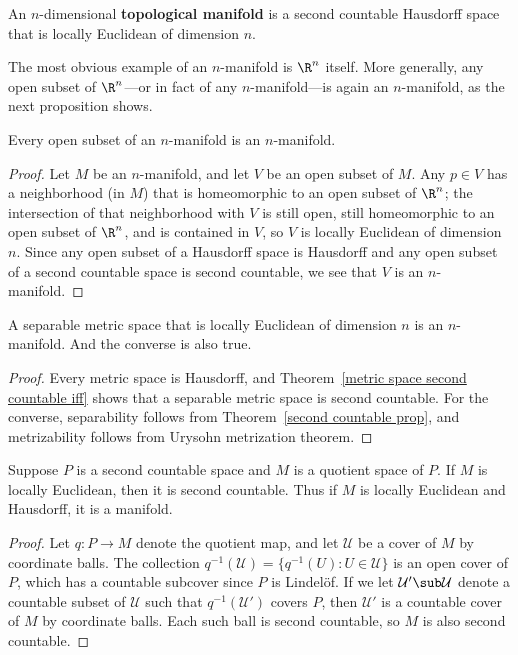 \begin{definition}
An $n$-dimensional \textbf{topological manifold} is a second countable Hausdorff space that is locally Euclidean of dimension $n$.
\end{definition}
The most obvious example of an $n$-manifold is $\R^n$ itself. More generally, any open subset of $\R^n$---or in fact of any $n$-manifold---is again an $n$-manifold, as the next proposition shows.
\begin{proposition}
Every open subset of an $n$-manifold is an $n$-manifold.
\end{proposition}
\begin{proof}
Let $M$ be an $n$-manifold, and let $V$ be an open subset of $M$. Any $p\in V$ has a neighborhood (in $M$) that is homeomorphic to an open subset of $\R^n$; the intersection of that neighborhood with $V$ is still open, still homeomorphic to an open subset of $\R^n$, and is contained in $V$, so $V$ is locally Euclidean of dimension $n$. Since any open subset of a Hausdorff space is Hausdorff and any open subset of a second countable space is second countable, we see that $V$ is an $n$-manifold.
\end{proof}
\begin{theorem}
A separable metric space that is locally Euclidean of dimension $n$ is an $n$-manifold. And the converse is also true.
\end{theorem}
\begin{proof}
Every metric space is Hausdorff, and Theorem~\ref{metric space second countable iff} shows that a separable metric space is second countable. For the converse, separability follows from Theorem~\ref{second countable prop}, and metrizability follows from Urysohn metrization theorem.
\end{proof}
\begin{proposition}\label{manifold quotient is manifold}
Suppose $P$ is a second countable space and $M$ is a quotient space of $P$. If $M$ is locally Euclidean, then it is second countable. Thus if $M$ is locally Euclidean and Hausdorff, it is a manifold.
\end{proposition}
\begin{proof}
Let $q:P\to M$ denote the quotient map, and let $\mathcal{U}$ be a cover of $M$ by coordinate balls. The collection $q^{-1}(\mathcal{U})=\{q^{-1}(U):U\in\mathcal{U}\}$ is an open cover of $P$, which has a countable subcover since $P$ is Lindel\"of. If we let $\mathcal{U}'\sub\mathcal{U}$ denote a countable subset of $\mathcal{U}$ such that $q^{-1}(\mathcal{U}')$ covers $P$, then $\mathcal{U}'$ is a countable cover of $M$ by coordinate balls. Each such ball is second countable, so $M$ is also second countable.
\end{proof}
